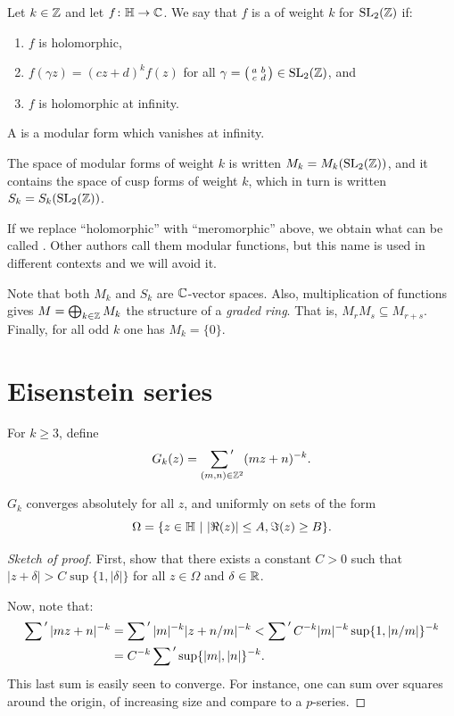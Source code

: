 \begin{definition}
  Let $k\in \mathbb{Z}$ and let $f\colon\mathbb{H}\to\mathbb{C}$. We say that $f$ is a  of weight $k$ for $\operatorname{SL}_2(\mathbb{Z})$ if:
  \begin{enumerate}
  \item $f$ is holomorphic,
  \item $f(\gamma z) = (cz+d)^kf(z)$ for all $\gamma=\left(\begin{smallmatrix}a&b\\c&d\end{smallmatrix}\right)\in\operatorname{SL}_2(\mathbb{Z})$, and
  \item $f$ is holomorphic at infinity.
  \end{enumerate}
A  is a modular form which vanishes at infinity.

The space of modular forms of weight $k$ is written $M_k=M_k(\operatorname{SL}_2(\mathbb{Z}))$, and it contains the space of cusp forms of weight $k$, which in turn is written $S_k=S_k(\operatorname{SL}_2(\mathbb{Z}))$.
\end{definition}


\begin{remark}
  If we replace ``holomorphic'' with ``meromorphic'' above, we obtain
  what can be called . Other authors
  call them modular functions, but this name is used in different
  contexts and we will avoid it.
\end{remark}

Note that both  $M_k$ and $S_k$ are $\mathbb{C}$-vector spaces. Also, multiplication of functions gives $M=\bigoplus_{k\in\mathbb{Z}} M_k$ the structure of a \emph{graded ring}. That is, $M_rM_s\subseteq M_{r+s}$. Finally,
for all odd $k$ one has $M_k = \{0\}$.


\section{Eisenstein series}
\label{sec:fourier-expansions-eisenstein}

For $k\geq 3$, define
\[
G_k(z) = \sumprime_{(m,n)\in \ZZ^2} (mz+n)^{-k}.
\]
\begin{lemma}
  $G_k$ converges absolutely for all $z$, and uniformly on sets of the form
\[
\Omega=\{z\in\mathbb{H}~|~|\Re(z)|\leq A,\Im(z)\geq B\}.
\]
\end{lemma}
\begin{proof}[Sketch of proof]

First, show that
there exists a constant $C>0$ such that $|z+\delta|>C\sup\{1,|\delta|\}$ for all $z\in\Omega$ and $\delta\in\mathbb{R}$.

Now, note that:
\begin{align*}
\sumprime |mz+n|^{-k} &= \sumprime |m|^{-k}|z+n/m|^{-k}<\sumprime C^{-k}|m|^{-k}\sup\{1,|n/m|\}^{-k}\\
&=C^{-k}\sumprime \sup\{|m|,|n|\}^{-k}.
\end{align*}
This last sum is easily seen to converge. For instance, one can sum over squares around the origin, of increasing size and compare to a $p$-series.

\end{proof}

